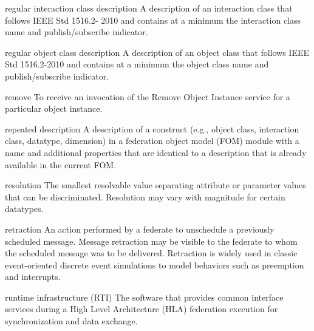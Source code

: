 \begin{definition}{regular interaction class description}
    A description of an interaction class that follows IEEE Std 1516.2- 2010 and contains at a minimum the interaction class name and publish/subscribe indicator.
\end{definition}

\begin{definition}{regular object class description}
    A description of an object class that follows IEEE Std 1516.2-2010 and contains at a minimum the object class name and publish/subscribe indicator.
\end{definition}

\begin{definition}{remove}
    To receive an invocation of the Remove Object Instance \textdagger{} service for a particular object instance.
\end{definition}


\begin{definition}{repeated description}
    A description of a construct (e.g., object class, interaction class, datatype, dimension) in a federation object model (FOM) module with a name and additional properties that are identical to a description that is already available in the current FOM.
\end{definition}

\begin{definition}{resolution}
    The smallest resolvable value separating attribute or parameter values that can be discriminated. Resolution may vary with magnitude for certain datatypes.
\end{definition}

\begin{definition}{retraction}
    An action performed by a federate to unschedule a previously scheduled message. Message retraction may be visible to the federate to whom the scheduled message was to be delivered. Retraction is widely used in classic event-oriented discrete event simulations to model behaviors such as preemption and interrupts.
\end{definition}

\begin{definition}{runtime infrastructure (RTI)}
    The software that provides common interface services during a High Level Architecture (HLA) federation execution for synchronization and data exchange.
\end{definition}

